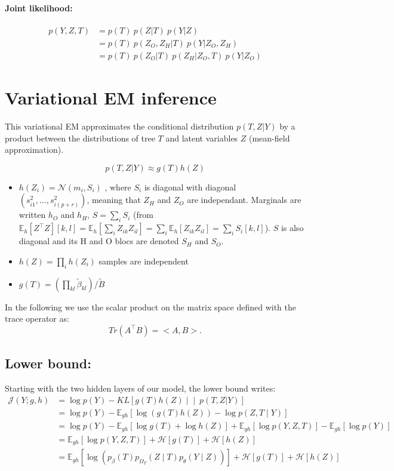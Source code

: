 \documentclass[11pt,a4paper]{article}
\newcommand{\Esp}{\mathds{E}}
\newcommand{\entr}{\mathcal{H}}
\begin{document}
\paragraph{Joint likelihood:}
\begin{align*}
p(Y,Z,T)& = p(T) \: p(Z|T) \: p(Y|Z) \\
&= p(T)\: p(Z_O,Z_H|T) \: p(Y|Z_O,Z_H) \\
&= p(T) \: p(Z_O|T) \: p(Z_H | Z_O,T)  \: p(Y|Z_O)
\end{align*} 
\section{Variational EM inference}

This variational EM approximates the conditional distribution $p(T,Z | Y)$ by a product  between the  distributions of tree $T$ and latent variables $Z$ (mean-field approximation).

$$p(T,Z | Y) \approx  g(T)h(Z)$$
\begin{itemize}
\item $ h(Z_i) =  \mathcal{N}(m_i,S_i)$ , where $S_i$ is diagonal with diagonal $(s_{i1}^2, ... , s_{i(p+r)}^2)$, meaning that $Z_H$ and $Z_O$ are independant. Marginals are written $h_O$  and  $h_H$, $S=\sum_i S_i$  (from $\Esp_h[Z^\intercal Z][k,l] = \Esp_h[\sum_i Z_{ik} Z_{il}] = \sum_i \Esp_h[Z_{ik}Z_{il}] = \sum_i S_i[k,l]$). $S$ is also diagonal and its H and O blocs are denoted $S_H$ and $S_O$.
\item $ h(Z) = \prod_i h(Z_i)$ samples are independent 
\item $ g(T) = \left(\prod_{kl} \widetilde{\beta}_{kl} \right) / \widetilde{B}$
\end{itemize}

In the following we use the scalar product on the matrix space defined with the trace operator as: 
$$  Tr(A^\intercal B) = <A,B> .$$
\subsection{Lower bound:}
Starting with the two hidden layers of our model, the lower bound writes:
\begin{align*}
\mathcal{J}(Y; g,h)&=\log p(Y) - KL\left[g(T) h(Z) \middle\vert\middle\vert\ p(T,Z | Y)\right]\\
&= \log p(Y) - \Esp_{gh}[\log( g(T) h(Z)) - \log p(Z,T\mid Y) ]\\
&= \log p(Y) - \Esp_{gh}[\log g(T) + \log h(Z) ] + \Esp_{gh}[\log p(Y,Z,T)] - \Esp_{gh}[\log p(Y)]\\
&= \Esp_{gh} [\log p(Y,Z,T)] + \entr[g(T)] + \entr[h(Z)]\\
&= \Esp_{gh} [\log (p_\beta(T)p_{\Omega_T}(Z\mid T)p_\theta(Y\mid Z))] + \entr[g(T)] + \entr[h(Z)]
\end{align*}
\end{document}
